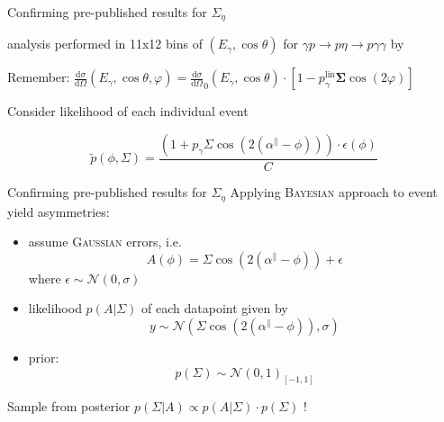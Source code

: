 \documentclass[11pt,aspectratio=169,dvipsnames]{beamer}
\newcommand{\thecolor}{black!70!blue}
\begin{document}
	\begin{frame}[noframenumbering]{Confirming pre-published results for $\Sigma_\eta$}
	
	\begin{minipage}{\linewidth}
			\begin{tcolorbox}[colback=blue!5,colframe=\thecolor,title={Event selection ($\eta$)}]
		analysis performed in 11x12 bins of $(E_\gamma,\cos\theta)$ for $\gamma p\to p\eta\to p\gamma\gamma$ by {\cites{eta}}
	\end{tcolorbox}
	\end{minipage}
	\begin{minipage}{\linewidth}
		\begin{tcolorbox}[colback=blue!5,colframe=\thecolor,title={Methods}]
			\begin{center}
				Remember: $\frac{\text{d}\sigma}{\text{d}\Omega}(E_\gamma,\cos\theta,\varphi)=\frac{\text{d}\sigma}{\text{d}\Omega}_0(E_\gamma,\cos\theta)\cdot\left[1-p_\gamma^{\text{lin}}\boldsymbol{\Sigma}\cos(2\varphi)\right]$
			\end{center}
			
			
			\begin{tcolorbox}[colback=blue!5,colframe=\thecolor,title={Unbinned maximum likelihood fit}]
				Consider likelihood of each individual event

					$$\tilde{p}(\phi,\Sigma)=\frac{\left(1+p_\gamma\Sigma\cos\left(2\left(\alpha^\parallel-\phi\right)\right)\right)\cdot\epsilon\left(\phi\right)}{C}$$
				
			\end{tcolorbox}		
			
		\end{tcolorbox}
	\end{minipage}
\end{frame}
	\begin{frame}{Confirming pre-published results for $\Sigma_\eta$}
		Applying \textsc{Bayesian} approach to event yield asymmetries:
		\begin{itemize}
			\item assume \textsc{Gaussian} errors, i.e.
			$$A(\phi)=\Sigma\cos\left(2\left(\alpha^\parallel-\phi\right)\right)+\epsilon$$ where $\epsilon\sim\mathcal{N}(0,\sigma)$
			\item likelihood $p(A|\Sigma)$ of each datapoint given by $$y\sim\mathcal{N}\left(\Sigma\cos\left(2\left(\alpha^\parallel-\phi\right)\right),\sigma\right)$$
			\item prior: $$p(\Sigma)\sim\mathcal{N}(0,1)_{[-1,1]}$$
		\end{itemize}
	Sample from posterior $p(\Sigma|A)\propto p(A|\Sigma)\cdot p(\Sigma)$ !
	\end{frame}
\end{document}
